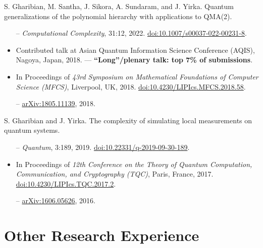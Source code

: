 \documentclass[11pt,letterpaper,serif]{moderncv}
\newcommand{\pubItemSep}{0em}
\begin{document}
S. Gharibian, M. Santha, J. Sikora, A. Sundaram, and J. Yirka.\quad
Quantum generalizations of the polynomial hierarchy with applications to QMA(2).
\begin{adjustwidth}{.25in}{}
	\begin{itemize}
		\item[--] \textit{Computational Complexity}, 31:12, 2022.\quad
		\href{https://doi.org/10.1007/s00037-022-00231-8}{doi:10.1007/s00037-022-00231-8}.
		\item Contributed talk at Asian Quantum Information Science Conference (AQIS), Nagoya, Japan, 2018. --- \textbf{``Long''/plenary talk: top 7\% of submissions}.
		\item In Proceedings of \textit{43rd Symposium on Mathematical Foundations of Computer Science (MFCS)}, Liverpool, UK, 2018. \quad
		\href{https://doi.org/10.4230/LIPIcs.MFCS.2018.58}{doi:10.4230/LIPIcs.MFCS.2018.58}.
		\item[--] \href{https://arxiv.org/abs/1805.11139}{arXiv:1805.11139}, 2018.
	\end{itemize}
\end{adjustwidth}
\medskip

S. Gharibian and J. Yirka.\quad
The complexity of simulating local measurements on quantum systems.
\begin{adjustwidth}{.25in}{}
	\begin{itemize}[itemsep=\pubItemSep]
		\item[--] \textit{Quantum}, 3:189, 2019. \quad
		\href{https://doi.org/10.22331/q-2019-09-30-189}{doi:10.22331/q-2019-09-30-189}.
		\item In Proceedings of \textit{12th Conference on the Theory of Quantum Computation, Communication,
		and Cryptography (TQC)}, Paris, France, 2017. \quad
		\href{https://doi.org/10.4230/LIPIcs.TQC.2017.2}{doi:10.4230/LIPIcs.TQC.2017.2}.
		\item[--] \href{https://arxiv.org/abs/1606.05626}{arXiv:1606.05626}, 2016.
	\end{itemize}
\end{adjustwidth}

\section{Other Research Experience}
\end{document}
